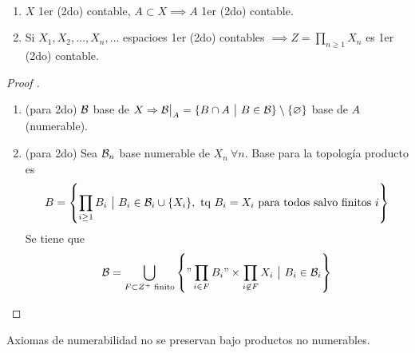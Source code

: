 \begin{prop}~
	\begin{enumerate}[1)]
		\item $X$ 1er (2do) contable, $A \subset X \implies A$ 1er (2do) contable.

		\item Si $X_{1},X_{2},\dots,X_{n},\dots$ espacioes 1er (2do) contables $\implies Z = \prod_{n \geq 1} X_{n}$ es 1er (2do) contable.
	\end{enumerate}
\end{prop}
\begin{proof}[Proof ]
	\begin{enumerate}[1)]
		\item (para 2do) $\mathcal{B}$ base de $X \implies \mcal{B}\big|_{A} = \{B \cap A \ \big| \ B \in \mcal{B}\} \setminus \{\varnothing\}$ base de $A$ (numerable).

		\item (para 2do) Sea $\mathcal{B}_{n}$ base numerable de $X_{n} \ \forall n$. Base para la topología producto es 
		\[ B = \left\{\prod_{i \geq 1} B_{i} \ \big| \ B_{i} \in \mathcal{B}_{i} \cup \{X_{i}\}, \text{ tq } B_{i} = X_{i} \text{ para todos salvo finitos } i\right\} \]
		Se tiene que
		\[ \mathcal{B} = \bigcup_{F \subset Z^{+} \text{ finito}} \left\{ "\prod_{i \in F} B_{i}" \times \prod_{i \not\in F} X_{i} \ \big| \ B_{i} \in \mathcal{B}_{i} \right\} \]
	\end{enumerate}
\end{proof}

\begin{remark}
	Axiomas de numerabilidad no se preservan bajo productos no numerables.
\end{remark}
